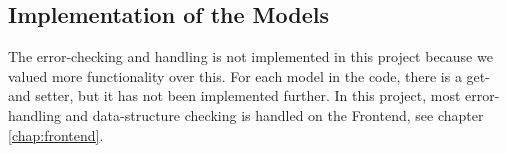 \subsection{Implementation of the Models}\label{subsec:implementationmodels}
The error-checking and handling is not implemented in this project because we valued more functionality over this. For each model in the code, there is a get- and setter, but it has not been implemented further. In this project, most error-handling and data-structure checking is handled on the Frontend, see chapter \ref{chap:frontend}.